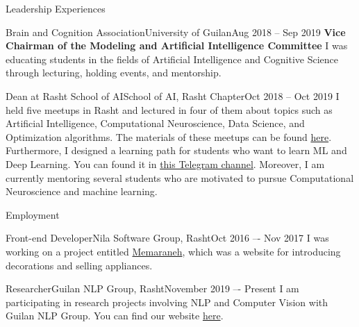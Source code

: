 \documentclass[]{mcdowellcv}
\begin{document}
	\begin{cvsection}{Leadership Experiences}
    		
    		\begin{cvsubsection}{Brain and Cognition Association}{University of Guilan}{Aug 2018 -- Sep 2019}
		        \textbf{Vice Chairman of the Modeling and Artificial Intelligence Committee} \newline
                I was educating students in the fields of Artificial Intelligence and Cognitive Science through lecturing, holding events, and mentorship. 
    		\end{cvsubsection}
    		
        	\begin{cvsubsection}{Dean at Rasht School of AI}{School of AI, Rasht Chapter}{Oct 2018 -- Oct 2019}
            I held five meetups in Rasht and lectured in four of them about topics such as Artificial Intelligence, Computational Neuroscience, Data Science, and Optimization algorithms. The materials of these meetups can be found \href{https://github.com/school-of-ai-rasht-chapter/Meetup-Materials}{here}. Furthermore, I designed a learning path for students who want to learn ML and Deep Learning. You can found it in \href{https://t.me/joinchat/GtdKmRJ2jXuzymyXm2RuQA}{this Telegram channel}. Moreover, I am currently mentoring several students who are motivated to pursue Computational Neuroscience and machine learning.
            \end{cvsubsection}
    
    \end{cvsection}
	\begin{cvsection}{Employment}

    		\begin{cvsubsection}{Front-end Developer}{Nila Software Group, Rasht}{Oct 2016 –- Nov 2017}
                I was working on a project entitled \href{https://memaraneh.com/}{Memaraneh}, which was a website for introducing decorations and selling appliances.
    		\end{cvsubsection}
    		
   
    		\begin{cvsubsection}{Researcher}{Guilan NLP Group, Rasht}{November 2019 –- Present}
    		    I am participating in research projects involving NLP and Computer Vision with Guilan NLP Group.
                You can find our website \href{https://nlp.guilan.ac.ir/}{here}.
    		\end{cvsubsection}
    
    \end{cvsection}
    
\end{document}
